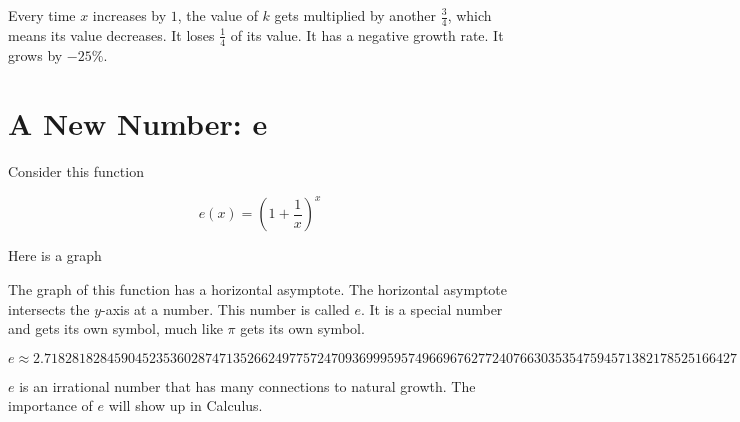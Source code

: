 \documentclass{ximera}
\begin{document}
Every time $x$ increases by $1$, the value of $k$ gets multiplied by another $\frac{3}{4}$, which means its value decreases. It loses $\frac{1}{4}$ of its value. It has a negative growth rate. It grows by $-25\%$.








\section{A New Number: e}


Consider this function 

\[
e(x) = \left(1 + \frac{1}{x}\right)^x
\]



Here is a graph


\begin{center}
\end{center}


The graph of this function has a horizontal asymptote.  The horizontal asymptote intersects the $y$-axis at a number.  This number is called $e$.   It is a special number and gets its own symbol, much like $\pi$ gets its own symbol.



\[
e \approx  2.718281828459045235360287471352662497757247093699959574966967627724076630353547594571382178525166427
\]


$e$ is an irrational number that has many connections to natural growth.  The importance of $e$ will show up in Calculus.
\end{document}
